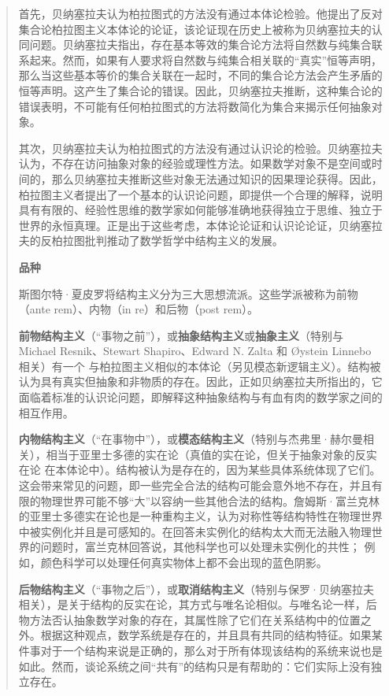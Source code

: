 \begin{quote}
首先，贝纳塞拉夫认为柏拉图式的方法没有通过本体论检验。他提出了反对集合论柏拉图主义本体论的论证，该论证现在历史上被称为贝纳塞拉夫的认同问题。贝纳塞拉夫指出，存在基本等效的集合论方法将自然数与纯集合联系起来。然而，如果有人要求将自然数与纯集合相关联的``真实''恒等声明，那么当这些基本等价的集合关联在一起时，不同的集合论方法会产生矛盾的恒等声明。这产生了集合论的错误。因此，贝纳塞拉夫推断，这种集合论的错误表明，不可能有任何柏拉图式的方法将数简化为集合来揭示任何抽象对象。

其次，贝纳塞拉夫认为柏拉图式的方法没有通过认识论的检验。贝纳塞拉夫认为，不存在访问抽象对象的经验或理性方法。如果数学对象不是空间或时间的，那么贝纳塞拉夫推断这些对象无法通过知识的因果理论获得。因此，柏拉图主义者提出了一个基本的认识论问题，即提供一个合理的解释，说明具有有限的、经验性思维的数学家如何能够准确地获得独立于思维、独立于世界的永恒真理。正是出于这些考虑，本体论论证和认识论论证，贝纳塞拉夫的反柏拉图批判推动了数学哲学中结构主义的发展。

\textbf{品种}

斯图尔特·夏皮罗将结构主义分为三大思想流派。这些学派被称为前物（ante
rem）、内物（in re）和后物（post rem）。

\textbf{前物结构主义}（``事物之前''），或\textbf{抽象结构主义}或\textbf{抽象主义}（特别与
Michael Resnik、Stewart Shapiro、Edward N. Zalta 和 Øystein Linnebo
相关）有一个
与柏拉图主义相似的本体论（另见模态新逻辑主义）。结构被认为具有真实但抽象和非物质的存在。因此，正如贝纳塞拉夫所指出的，它面临着标准的认识论问题，即解释这种抽象结构与有血有肉的数学家之间的相互作用。

\textbf{内物结构主义}（``在事物中''），或\textbf{模态结构主义}（特别与杰弗里·赫尔曼相关），相当于亚里士多德的实在论（真值的实在论，但关于抽象对象的反实在论
在本体论中）。结构被认为是存在的，因为某些具体系统体现了它们。这会带来常见的问题，即一些完全合法的结构可能会意外地不存在，并且有限的物理世界可能不够``大''以容纳一些其他合法的结构。詹姆斯·富兰克林的亚里士多德实在论也是一种重构主义，认为对称性等结构特性在物理世界中被实例化并且是可感知的。在回答未实例化的结构太大而无法融入物理世界的问题时，富兰克林回答说，其他科学也可以处理未实例化的共性；
例如，颜色科学可以处理任何真实物体上都不会出现的蓝色阴影。

\textbf{后物结构主义}（``事物之后''），或\textbf{取消结构主义}（特别与保罗·贝纳塞拉夫相关），是关于结构的反实在论，其方式与唯名论相似。与唯名论一样，后物方法否认抽象数学对象的存在，其属性除了它们在关系结构中的位置之外。根据这种观点，数学系统是存在的，并且具有共同的结构特征。如果某件事对于一个结构来说是正确的，那么对于所有体现该结构的系统来说也是如此。然而，谈论系统之间``共有''的结构只是有帮助的：它们实际上没有独立存在。
\end{quote}

